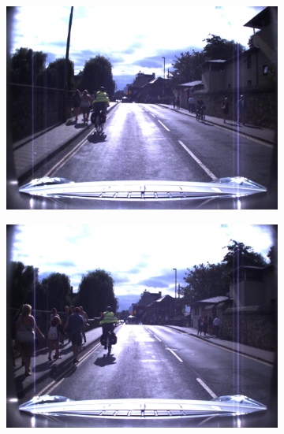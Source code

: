 \documentclass[10pt, aspectratio=169]{beamer}
\begin{document}
\begin{frame}{}
       \begin{figure}
        \centering
        \begin{subfigure}{0.46\textwidth}
            \includegraphics[width=\textwidth]{contents/images/ex2/01093.jpg}
        \end{subfigure}
        \hfill
        \hfill
        \begin{subfigure}{0.46\textwidth}
            \includegraphics[width=\textwidth]{contents/images/ex2/01115.jpg}
        \end{subfigure}
    \end{figure}
\end{frame}
\end{document}

